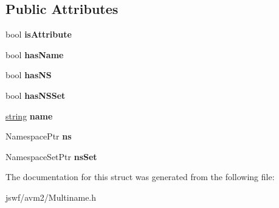 \subsection*{Public Attributes}
\begin{DoxyCompactItemize}
\item 
\hypertarget{structjswf_1_1avm2_1_1_multiname_a7889ccdaa065487d132fea3483584d1c}{bool {\bfseries is\+Attribute}}\label{structjswf_1_1avm2_1_1_multiname_a7889ccdaa065487d132fea3483584d1c}

\item 
\hypertarget{structjswf_1_1avm2_1_1_multiname_a5899eff28deedf652d865aa2600525f5}{bool {\bfseries has\+Name}}\label{structjswf_1_1avm2_1_1_multiname_a5899eff28deedf652d865aa2600525f5}

\item 
\hypertarget{structjswf_1_1avm2_1_1_multiname_aa166b6549a3616cae069eb3de3d09a06}{bool {\bfseries has\+N\+S}}\label{structjswf_1_1avm2_1_1_multiname_aa166b6549a3616cae069eb3de3d09a06}

\item 
\hypertarget{structjswf_1_1avm2_1_1_multiname_a6c397704639dca3f1f17638e20b1a329}{bool {\bfseries has\+N\+S\+Set}}\label{structjswf_1_1avm2_1_1_multiname_a6c397704639dca3f1f17638e20b1a329}

\item 
\hypertarget{structjswf_1_1avm2_1_1_multiname_aa87f364be6754d915e3e3171e33c9943}{\hyperlink{namespacejswf_a755127d61081aa8af105eb800aa2c1ec}{string} {\bfseries name}}\label{structjswf_1_1avm2_1_1_multiname_aa87f364be6754d915e3e3171e33c9943}

\item 
\hypertarget{structjswf_1_1avm2_1_1_multiname_a8c3317cb1a0f95499ebf09d1365cfa5e}{Namespace\+Ptr {\bfseries ns}}\label{structjswf_1_1avm2_1_1_multiname_a8c3317cb1a0f95499ebf09d1365cfa5e}

\item 
\hypertarget{structjswf_1_1avm2_1_1_multiname_ac2abee430648891504ea6765388f4395}{Namespace\+Set\+Ptr {\bfseries ns\+Set}}\label{structjswf_1_1avm2_1_1_multiname_ac2abee430648891504ea6765388f4395}

\end{DoxyCompactItemize}


The documentation for this struct was generated from the following file\+:\begin{DoxyCompactItemize}
\item 
jswf/avm2/Multiname.\+h\end{DoxyCompactItemize}
